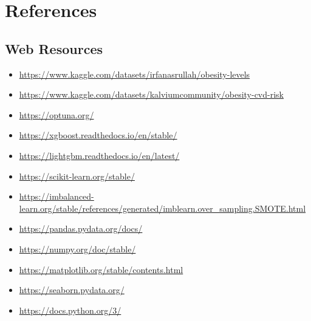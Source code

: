 \documentclass[12pt,a4paper]{report}
\begin{document}
    {
        \chapter*{References}
        \printbibliography

        \vspace{1em}
        \section*{Web Resources}

        \begin{itemize}
            \item \url{https://www.kaggle.com/datasets/irfanasrullah/obesity-levels}
            \item \url{https://www.kaggle.com/datasets/kalviumcommunity/obesity-cvd-risk}
            \item \url{https://optuna.org/}
            \item \url{https://xgboost.readthedocs.io/en/stable/}
            \item \url{https://lightgbm.readthedocs.io/en/latest/}
            \item \url{https://scikit-learn.org/stable/}
            \item \url{https://imbalanced-learn.org/stable/references/generated/imblearn.over_sampling.SMOTE.html}
            \item \url{https://pandas.pydata.org/docs/}
            \item \url{https://numpy.org/doc/stable/}
            \item \url{https://matplotlib.org/stable/contents.html}
            \item \url{https://seaborn.pydata.org/}
            \item \url{https://docs.python.org/3/}
        \end{itemize}
    }
\end{document}
